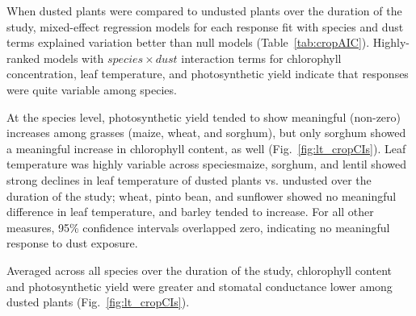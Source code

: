 \documentclass{svjour3}
\begin{document}
When dusted plants were compared to undusted plants over the duration of the study, mixed-effect regression models for each response fit with species and dust terms explained variation better than null models (Table~\ref{tab:cropAIC}). 
Highly-ranked models with $species \times dust$ interaction terms for chlorophyll concentration, leaf temperature, and photosynthetic yield indicate that responses were quite variable among species. 

At the species level, photosynthetic yield tended to show meaningful (non-zero) increases among grasses (maize, wheat, and sorghum), but only sorghum showed a meaningful increase in chlorophyll content, as well (Fig.~\ref{fig:lt_cropCIs}). 
Leaf temperature was highly variable across species\textemdash maize, sorghum, and lentil showed strong declines in leaf temperature of dusted plants vs. undusted over the duration of the study; wheat, pinto bean, and sunflower showed no meaningful difference in leaf temperature, and barley tended to increase. 
For all other measures, 95\% confidence intervals overlapped zero, indicating no meaningful response to dust exposure. 

Averaged across all species over the duration of the study, chlorophyll content and photosynthetic yield were greater and stomatal conductance lower among dusted plants (Fig.~\ref{fig:lt_cropCIs}). 
\end{document}
